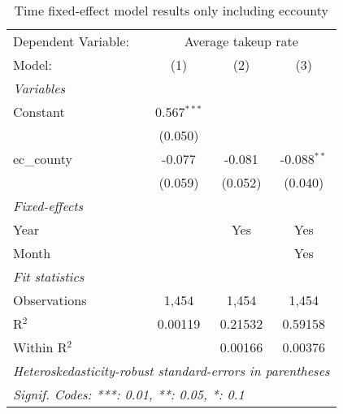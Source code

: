 \documentclass{article}
\begin{document}
\begin{table}[htbp]
   \centering
   \begin{tabular}{lccc}
      \tabularnewline \midrule \midrule
      Dependent Variable: & \multicolumn{3}{c}{Average takeup rate}\\
      Model:       & (1)           & (2)     & (3)\\  
      \midrule
      \emph{Variables}\\
      Constant     & 0.567$^{***}$ &         &   \\   
                   & (0.050)       &         &   \\   
      ec\_county   & -0.077        & -0.081  & -0.088$^{**}$\\   
                   & (0.059)       & (0.052) & (0.040)\\   
      \midrule
      \emph{Fixed-effects}\\
      Year         &               & Yes     & Yes\\  
      Month        &               &         & Yes\\  
      \midrule
      \emph{Fit statistics}\\
      Observations & 1,454         & 1,454   & 1,454\\  
      R$^2$        & 0.00119       & 0.21532 & 0.59158\\  
      Within R$^2$ &               & 0.00166 & 0.00376\\  
      \midrule \midrule
      \multicolumn{4}{l}{\emph{Heteroskedasticity-robust standard-errors in parentheses}}\\
      \multicolumn{4}{l}{\emph{Signif. Codes: ***: 0.01, **: 0.05, *: 0.1}}\\
   \end{tabular}
   \caption{Time fixed-effect model results only including ec\textunderscore county}
      \label{result1}
\end{table}
\end{document}
